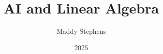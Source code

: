 \documentclass{article}
\title{AI and Linear Algebra}
\author{Maddy Stephens}
\date{2025}
\begin{document}
\maketitle

\section{}
\end{document}
